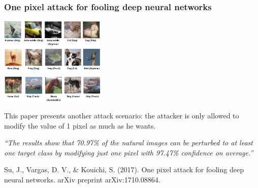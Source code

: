 \documentclass[9pt]{beamer}
\begin{document}
\begin{frame}
  \frametitle{One pixel attack for fooling deep neural networks}

  \begin{center}
    \includegraphics[width = 5cm]{images/one_pixel.png}
  \end{center}

  This paper presents another attack scenario: the attacker is only
  allowed to modify the value of 1 pixel as much as he wants.

  \medskip

  \textit{``The results show that 70.97\% of the natural images can be
    perturbed to at least one target class by modifying just one pixel
    with 97.47\% confidence on average.''}

  \bigskip

  {\scriptsize Su, J., Vargas, D. V., \& Kouichi, S. (2017). One pixel
    attack for fooling deep neural networks. arXiv preprint
    arXiv:1710.08864.}
\end{frame}
\end{document}
